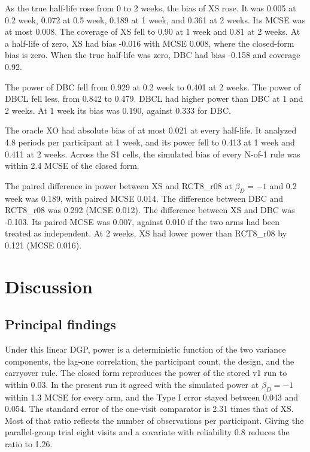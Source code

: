 \documentclass[
  11pt,
]{article}
\begin{document}
As the true half-life rose from 0 to 2 weeks, the bias of XS rose. It was 0.005 at 0.2 week, 0.072 at 0.5 week, 0.189 at 1 week, and 0.361 at 2 weeks. Its MCSE was at most 0.008. The coverage of XS fell to 0.90 at 1 week and 0.81 at 2 weeks. At a half-life of zero, XS had bias -0.016 with MCSE 0.008, where the closed-form bias is zero. When the true half-life was zero, DBC had bias -0.158 and coverage 0.92.

The power of DBC fell from 0.929 at 0.2 week to 0.401 at 2 weeks. The power of DBCL fell less, from 0.842 to 0.479. DBCL had higher power than DBC at 1 and 2 weeks. At 1 week its bias was 0.190, against 0.333 for DBC.

The oracle XO had absolute bias of at most 0.021 at every half-life. It analyzed 4.8 periods per participant at 1 week, and its power fell to 0.413 at 1 week and 0.411 at 2 weeks. Across the S1 cells, the simulated bias of every N-of-1 rule was within 2.4 MCSE of the closed form.

The paired difference in power between XS and RCT8\_r08 at \(\beta_D = -1\) and 0.2 week was 0.189, with paired MCSE 0.014. The difference between DBC and RCT8\_r08 was 0.292 (MCSE 0.012). The difference between XS and DBC was -0.103. Its paired MCSE was 0.007, against 0.010 if the two arms had been treated as independent. At 2 weeks, XS had lower power than RCT8\_r08 by 0.121 (MCSE 0.016).

\section{Discussion}\label{discussion}

\subsection{Principal findings}\label{principal-findings}

Under this linear DGP, power is a deterministic function of the two variance components, the lag-one correlation, the participant count, the design, and the carryover rule. The closed form reproduces the power of the stored v1 run to within 0.03. In the present run it agreed with the simulated power at \(\beta_D = -1\) within 1.3 MCSE for every arm, and the Type I error stayed between 0.043 and 0.054. The standard error of the one-visit comparator is 2.31 times that of XS. Most of that ratio reflects the number of observations per participant. Giving the parallel-group trial eight visits and a covariate with reliability 0.8 reduces the ratio to 1.26.
\end{document}
